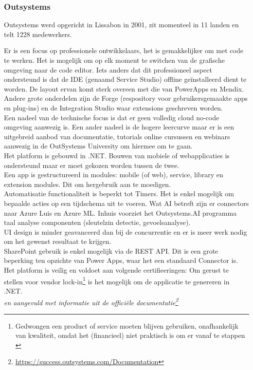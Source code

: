\subsubsection{Outsystems}

Outsystems werd opgericht in Lissabon in 2001, zit momenteel in 11 landen en telt 1228 medewerkers.

Er is een focus op professionele ontwikkelaars, het is gemakkelijker om met code te werken. Het is mogelijk om op elk moment te switchen van de grafische omgeving naar de code editor. Iets anders dat dit professioneel aspect ondersteund is dat de IDE (genaamd Service Studio) offline geïnstalleerd dient te worden. De layout ervan komt sterk overeen met die van PowerApps en Mendix. Andere grote onderdelen zijn de Forge (respository voor gebruikersgemaakte apps en plug-ins) en de Integration Studio waar extensions geschreven worden.\\
Een nadeel van de technische focus is dat er geen volledig cloud no-code omgeving aanwezig is. Een ander nadeel is de hogere leercurve maar er is een uitgebreid aanbod van documentatie, tutorials online cursussen en webinars aanwezig in de OutSystems University om hiermee om te gaan.\\
Het platform is gebouwd in .NET. Bouwen van mobiele of webapplicaties is ondersteund maar er moet gekozen worden tussen de twee.\\
Een app is gestructureerd in modules: mobile (of web), service, library en extension modules. Dit om hergebruik aan te moedigen.\\
Automatisatie functionaliteit is beperkt tot Timers. Het is enkel mogelijk om bepaalde acties op een tijdschema uit te voeren. Wat AI betreft zijn er connectors naar Azure Luis en Azure ML. Inhuis voorziet het Outsystems.AI programma taal analyse componenten (sleutelzin detectie, gevoelsanalyse).\\
UI design is minder geavanceerd dan bij de concurrentie en er is meer werk nodig om het gewenst resultaat te krijgen.\\
SharePoint gebruik is enkel mogelijk via de REST API. Dit is een grote beperking ten opzichte van Power Apps, waar het een standaard Connector is.\\
Het platform is veilig en voldoet aan volgende certifieeringen: %
Om gerust te stellen voor vendor lock-in\footnote{Gedwongen een product of service moeten blijven gebruiken, onafhankelijk van kwaliteit, omdat het (financieel) niet praktisch is om er vanaf te stappen \autocite{Cloudflare}} is het mogelijk om de applicatie te genereren in .NET.\\
\autocite{Marvin2017} \textit{en aangevuld met informatie uit de officiële documentatie\footnote{\url{https://success.outsystems.com/Documentation}}} 

